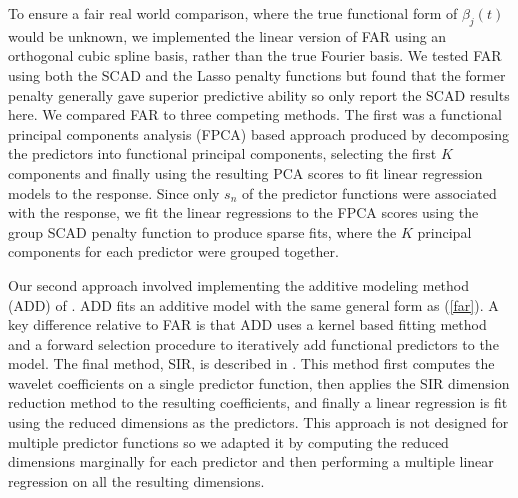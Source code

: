\documentclass[aos,MSNbibl,dvips]{arximspdf}
\newcommand{\btheta}{\bolds\theta}
\newcommand{\bb}{\mathbf{b}}
\newcommand{\bX}{{\mathbf X}}
\begin{document}
To ensure a fair real world comparison, where the true functional form
of $\beta_j(t)$ would be unknown, we implemented the linear version of
FAR using an orthogonal cubic spline basis, rather than the true
Fourier basis. We tested FAR using both the SCAD \cite{fan2} and the
Lasso penalty functions but found that the former penalty generally
gave superior predictive ability so only report the SCAD results here.
%
We compared FAR to three competing methods. The first was a functional principal
components analysis (FPCA) based approach produced by decomposing the
predictors into functional principal components, selecting the first
$K$ components
and finally using the resulting PCA scores to fit linear regression
models to the response. Since only $s_n$ of the predictor functions
were associated with the response, we fit the linear regressions to the
FPCA scores using the group SCAD penalty function to produce sparse
fits, where the $K$ principal components for each predictor were
grouped together.

Our second approach involved implementing the additive modeling method
(ADD) of \cite{ferraty3}. ADD fits an additive model with the same
general form as (\ref{far}). A key difference relative to FAR is that
ADD uses a kernel based fitting method and a forward selection
procedure to iteratively add functional predictors to the model. The
final method, SIR, is described in \cite{amato1}. This method first
computes the wavelet coefficients on a single predictor function, then
applies the SIR \cite{li1} dimension reduction method to the
resulting coefficients, and finally a linear regression is fit using
the reduced dimensions as the predictors. This approach is not designed
for multiple predictor functions so we adapted it by computing the
reduced dimensions marginally for each predictor and then performing a
multiple linear regression on all the resulting dimensions.
\end{document}
